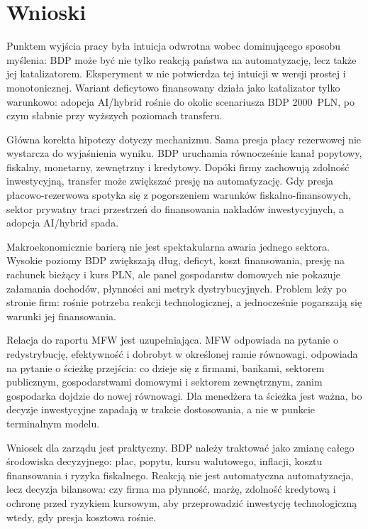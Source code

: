 \section{Wnioski}

Punktem wyjścia pracy była intuicja odwrotna wobec dominującego sposobu myślenia: BDP może być nie tylko reakcją państwa na automatyzację, lecz także jej katalizatorem. Eksperyment w \amor{} nie potwierdza tej intuicji w wersji prostej i monotonicznej. Wariant deficytowo finansowany działa jako katalizator tylko warunkowo: adopcja AI/hybrid rośnie do okolic scenariusza BDP 2000~PLN, po czym słabnie przy wyższych poziomach transferu.

Główna korekta hipotezy dotyczy mechanizmu. Sama presja płacy rezerwowej nie wystarcza do wyjaśnienia wyniku. BDP uruchamia równocześnie kanał popytowy, fiskalny, monetarny, zewnętrzny i kredytowy. Dopóki firmy zachowują zdolność inwestycyjną, transfer może zwiększać presję na automatyzację. Gdy presja płacowo-rezerwowa spotyka się z pogorszeniem warunków fiskalno-finansowych, sektor prywatny traci przestrzeń do finansowania nakładów inwestycyjnych, a adopcja AI/hybrid spada.

Makroekonomicznie barierą nie jest spektakularna awaria jednego sektora. Wysokie poziomy BDP zwiększają dług, deficyt, koszt finansowania, presję na rachunek bieżący i kurs PLN, ale panel gospodarstw domowych nie pokazuje załamania dochodów, płynności ani metryk dystrybucyjnych. Problem leży po stronie firm: rośnie potrzeba reakcji technologicznej, a jednocześnie pogarszają się warunki jej finansowania.

Relacja do raportu MFW jest uzupełniająca. MFW odpowiada na pytanie o redystrybucję, efektywność i dobrobyt w określonej ramie równowagi. \amor{} odpowiada na pytanie o ścieżkę przejścia: co dzieje się z firmami, bankami, sektorem publicznym, gospodarstwami domowymi i sektorem zewnętrznym, zanim gospodarka dojdzie do nowej równowagi. Dla menedżera ta ścieżka jest ważna, bo decyzje inwestycyjne zapadają w trakcie dostosowania, a nie w punkcie terminalnym modelu.

Wniosek dla zarządu jest praktyczny. BDP należy traktować jako zmianę całego środowiska decyzyjnego: płac, popytu, kursu walutowego, inflacji, kosztu finansowania i ryzyka fiskalnego. Reakcją nie jest automatyczna automatyzacja, lecz decyzja bilansowa: czy firma ma płynność, marżę, zdolność kredytową i ochronę przed ryzykiem kursowym, aby przeprowadzić inwestycję technologiczną wtedy, gdy presja kosztowa rośnie.

